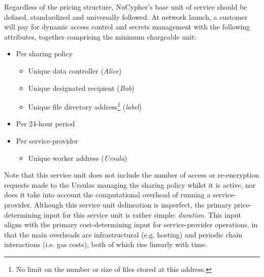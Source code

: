 \documentclass[longbibliography,nofootinbib]{revtex4-1}
\begin{document}
Regardless of the pricing structure, NuCypher’s base unit of service should be defined, standardized and universally followed. At network launch, a customer will pay for dynamic access control and secrets management with the following attributes, together comprising the minimum chargeable unit: 
\begin{itemize}
    \item Per sharing policy
    \begin{itemize}
        \item Unique data controller (\textit{Alice})
        \item Unique designated recipient (\textit{Bob})
        \item Unique file directory address\footnote{No limit on the number or size of files stored at this address.} (\textit{label})
    \end{itemize}
    \item Per 24-hour period
    \item Per service-provider
    \begin{itemize}
        \item Unique worker address (\textit{Ursula})
    \end{itemize}
\end{itemize}

Note that this service unit does not include the number of access or re-encryption requests made to the Ursulas managing the sharing policy whilst it is active, nor does it take into account the computational overhead of running a service-provider. Although this service unit delineation is imperfect, the primary price-determining input for this service unit is rather simple: \textit{duration}. This input aligns with the primary cost-determining input for service-provider operations, in that the main overheads are infrastructural (e.g. hosting) and periodic chain interactions (i.e. gas costs), both of which rise linearly with time. 


\end{document}
